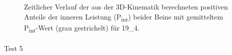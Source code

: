 \documentclass[
  letterpaper,
  DIV=11]{scrartcl}
\makeatletter
\let\oldparagraph\paragraph
\renewcommand{\paragraph}{
    \@ifstar
      \xxxParagraphStar
      \xxxParagraphNoStar
  }
\newcommand{\xxxParagraphStar}[1]{\oldparagraph*{#1}\mbox{}}
\newcommand{\xxxParagraphNoStar}[1]{\oldparagraph{#1}\mbox{}}
\makeatother
\begin{document}
\begin{figure}


\caption{\label{fig-PInt_Kinematik_19_4}Zeitlicher Verlauf der aus der
3D-Kinematik berechneten positiven Anteile der inneren Leistung
(P\textsubscript{int}) beider Beine mit gemitteltem
P\textsubscript{int}-Wert (grau gestrichelt) für 19\_4.}

\end{figure}%

\paragraph{Test 5}
\end{document}
